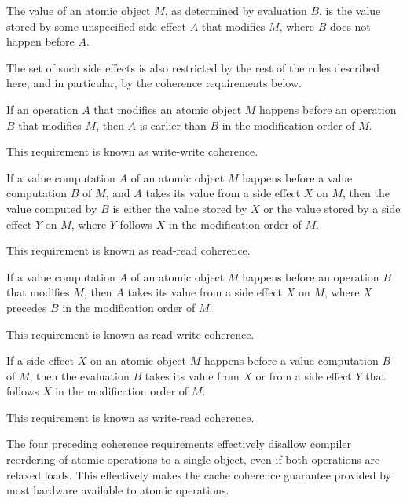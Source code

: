 \pnum
The value of an
atomic object $M$, as determined by evaluation $B$, is the value
stored by some unspecified
side effect $A$ that modifies $M$, where $B$ does not happen
before $A$.
\begin{note}
The set of such side effects is also restricted by the rest of the rules
described here, and in particular, by the coherence requirements below.
\end{note}

\pnum
{}%
If an operation $A$ that modifies an atomic object $M$ happens before
an operation $B$ that modifies $M$, then $A$ is earlier
than $B$ in the modification order of $M$.
\begin{note}
This requirement is known as write-write coherence.
\end{note}

\pnum
{}%
If a
%
value computation $A$ of an atomic object $M$ happens before a
value computation $B$ of $M$, and $A$ takes its value from a side
effect $X$ on $M$, then the value computed by $B$ is either
the value stored by $X$ or the value stored by a
%
side effect $Y$ on $M$,
where $Y$ follows $X$ in the modification order of $M$.
\begin{note}
This requirement is known as read-read coherence.
\end{note}

\pnum
{}%
If a
%
value computation $A$ of an atomic object $M$ happens before an
operation $B$ that modifies $M$, then $A$ takes its value from a side
effect $X$ on $M$, where $X$ precedes $B$ in the
modification order of $M$.
\begin{note}
This requirement is known as
read-write coherence.
\end{note}

\pnum
{}%
If a
%
side effect $X$ on an atomic object $M$ happens before a value
computation $B$ of $M$, then the evaluation $B$ takes its
value from $X$ or from a
%
side effect $Y$ that follows $X$ in the modification order of $M$.
\begin{note}
This requirement is known as write-read coherence.
\end{note}

\pnum
\begin{note}
The four preceding coherence requirements effectively disallow
compiler reordering of atomic operations to a single object, even if both
operations are relaxed loads. This effectively makes the cache coherence
guarantee provided by most hardware available to \Cpp{} atomic operations.
\end{note}


